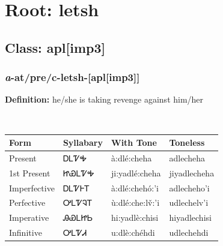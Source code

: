 \needspace{4in}
\section*{Root: letsh}
\nopagebreak
{}
\needspace{3in}
\subsection*{Class: apl[imp3]}
\nopagebreak
\needspace{2in}
\subsubsection*{\textit{a}{-}at/pre/c{-}\textbf{letsh}{-}[apl[imp3]]}
\nopagebreak
\textbf{Definition: } he/she is taking revenge against him/her
\\[0.5em]
\begin{tabularx}{\textwidth}{l X X X}%
\toprule%
\textbf{Form}&\textbf{Syllabary}&\textbf{With Tone}&\textbf{Toneless}\\%
\midrule%
Present&ᎠᏞᏤᎭ&à:dlé:cheha&adlecheha\\%
1st Present&ᏥᏯᏞᏤᎭ&ji:yadlé:cheha&jiyadlecheha\\%
Imperfective&ᎠᏞᏤᎰᎢ&à:dlé:chehó:’i&adlecheho’i\\%
Perfective&ᎤᏞᏤᎸᎢ&ù:dlé:che:lv̌:’i&udlechelv’i\\%
Imperative&ᎯᏯᏞᏥᏏ&hi:yadlè:chisi&hiyadlechisi\\%
Infinitive&ᎤᏞᏤᏗ&u:dlè:chéhdi&udlechehdi\\%
\bottomrule%
\end{tabularx}
\\[1em]
